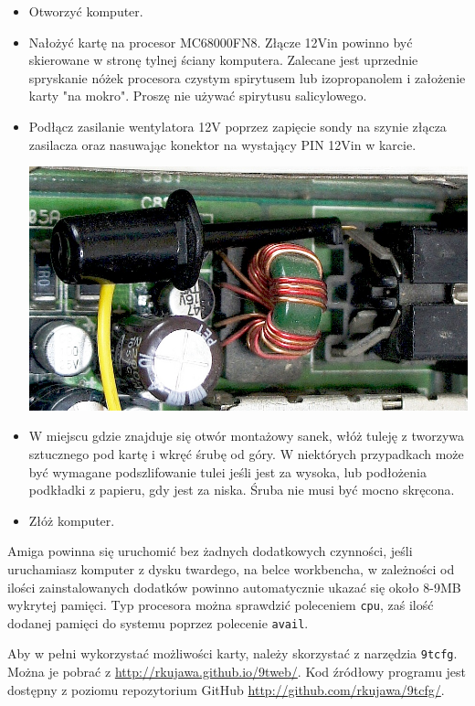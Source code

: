 \documentclass[10pt,a5paper]{article}
\begin{document}
\begin{itemize}\itemsep0pt
	\item Otworzyć komputer.
	\item Nałożyć kartę na procesor MC68000FN8. Złącze 12Vin powinno być skierowane w stronę tylnej ściany komputera. Zalecane jest uprzednie spryskanie nóżek procesora czystym spirytusem lub izopropanolem i założenie karty "na mokro". Proszę nie używać spirytusu salicylowego.
	\item Podłącz zasilanie wentylatora 12V poprzez zapięcie sondy na szynie złącza zasilacza oraz nasuwając konektor na wystający PIN 12Vin w karcie.\\
	\begin{center}
	\includegraphics[scale=1]{probe.jpg}
	\end{center}

	\item W miejscu gdzie znajduje się otwór montażowy sanek, włóż tuleję z tworzywa sztucznego pod kartę  i wkręć śrubę od góry. W niektórych przypadkach może być wymagane podszlifowanie tulei jeśli jest za wysoka, lub podłożenia podkładki z papieru, gdy jest za niska. Śruba nie musi być mocno skręcona.
	\item Złóż komputer.
\end{itemize}


Amiga powinna się uruchomić bez żadnych dodatkowych czynności, jeśli uruchamiasz komputer z dysku twardego, na belce workbencha, w zależności od ilości zainstalowanych dodatków powinno automatycznie ukazać się około 8-9MB wykrytej pamięci. Typ procesora można sprawdzić poleceniem {\tt cpu}, zaś ilość dodanej pamięci do systemu poprzez polecenie {\tt avail}.

Aby w pełni wykorzystać możliwości karty, należy skorzystać z narzędzia  {\tt 9tcfg}. Można je pobrać z \url{http://rkujawa.github.io/9tweb/}. Kod źródłowy programu jest dostępny z poziomu repozytorium GitHub \url{http://github.com/rkujawa/9tcfg/}.
\end{document}
